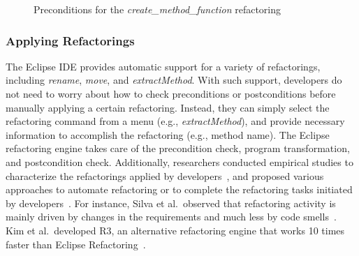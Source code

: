 \documentclass[runningheads,a4paper]{llncs}
\begin{document}
\begin{figure}[!htb]
\centering
{}
\caption{Preconditions for the \emph{create\_method\_function} refactoring~\cite{Opdyke1992:ROF}}
\label{fig:preconditions}
\end{figure}

\subsubsection{Applying Refactorings}
The Eclipse IDE provides automatic support for a variety of refactorings, including \emph{rename}, \emph{move}, and \emph{extractMethod}. With such support, developers do not need to worry about how to check preconditions or postconditions before manually applying a certain refactoring. Instead, they can simply select the refactoring command from a menu (e.g., \emph{extractMethod}), and provide necessary information to accomplish the refactoring (e.g., method name). The Eclipse refactoring engine takes care of the precondition check, program transformation, and postcondition check. Additionally, 
researchers conducted empirical studies to characterize the refactorings applied by developers~\cite{Kim2012:FSR,Murphy-Hill2012:refactor,Vailian2012:misuse,Silva2016:WWR}, and proposed various approaches to automate refactoring or to complete the refactoring tasks initiated by developers~\cite{Griswold:1992,Balazinska1999,Dig:2009,Ge:2012,Chen:2013,Lee:2013,Tsantalis2013:icsm,Meng:2015,Kim:2016}. For instance, Silva et al.~observed that refactoring activity is mainly driven by changes in the requirements and much less by code smells~\cite{Silva2016:WWR}. Kim et al.~developed R3, an alternative refactoring engine that works 10 times faster than Eclipse Refactoring~\cite{Kim:2016}. 
\end{document}
